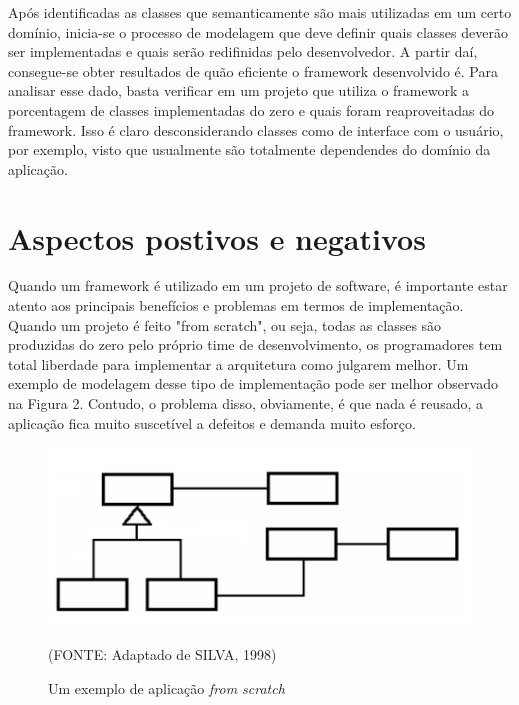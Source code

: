 \documentclass[
    12pt,       %
    openright,      %
    twoside,      %
    a4paper,      %
    english,      %
    french,       %
    spanish,      %
    brazil,       %
    ]{abntex2}
\begin{document}
          Após identificadas as classes que semanticamente são mais utilizadas em um
          certo domínio, inicia-se o processo de modelagem
          que deve definir quais classes deverão ser implementadas e quais serão
          redifinidas pelo desenvolvedor. A partir daí, consegue-se obter resultados
          de quão eficiente o framework desenvolvido é. Para analisar esse dado,
          basta verificar em um projeto que utiliza o framework a porcentagem
          de classes implementadas do zero e quais foram reaproveitadas do framework.
          Isso é claro desconsiderando classes como de interface com o usuário, por
          exemplo, visto que usualmente são totalmente dependendes do domínio da aplicação.

      \section{Aspectos postivos e negativos}
          Quando um framework é utilizado em um projeto de software, é importante estar
          atento aos principais benefícios e problemas em termos de implementação. Quando
          um projeto é feito "from scratch", ou seja, todas as classes são produzidas do
          zero pelo próprio time de desenvolvimento, os programadores tem total liberdade
          para implementar a arquitetura como julgarem melhor. Um exemplo de modelagem desse
          tipo de implementação pode ser melhor observado na Figura 2. Contudo, o problema
          disso, obviamente, é que nada é reusado, a aplicação fica muito suscetível a
          defeitos e demanda muito esforço.

          \begin{figure}[htbp]
              \begin{center}
                  \includegraphics[width=1.0\textwidth]{img/scratch.png}
              \end{center}
              \caption{\label{fig:passaro}Um exemplo de aplicação \textit{from scratch}}
              \begin{center}(FONTE: Adaptado de SILVA, 1998)\end{center}
          \end{figure}
\end{document}
